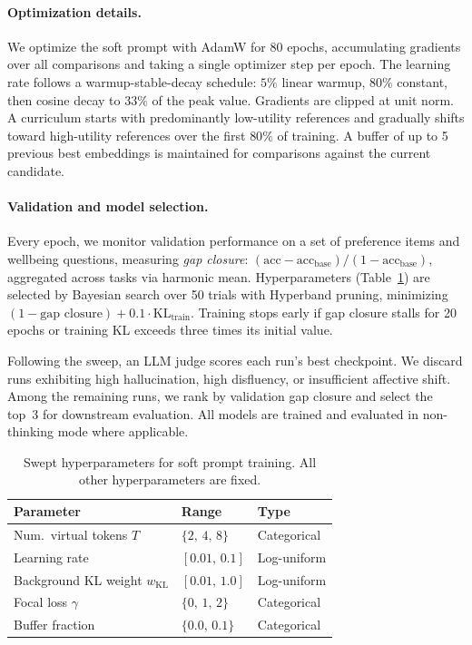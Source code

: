 \paragraph{Optimization details.}
We optimize the soft prompt with AdamW for 80 epochs, accumulating gradients over all comparisons and taking a single optimizer step per epoch.
The learning rate follows a warmup-stable-decay schedule: $5\%$ linear warmup, $80\%$ constant, then cosine decay to $33\%$ of the peak value.
Gradients are clipped at unit norm.
A curriculum starts with predominantly low-utility references and gradually shifts toward high-utility references over the first $80\%$ of training.
A buffer of up to 5 previous best embeddings is maintained for comparisons against the current candidate.

\paragraph{Validation and model selection.}
Every epoch, we monitor validation performance on a set of preference items and wellbeing questions, measuring \emph{gap closure}: $(\mathrm{acc} - \mathrm{acc}_\mathrm{base}) / (1 - \mathrm{acc}_\mathrm{base})$, aggregated across tasks via harmonic mean.
Hyperparameters (Table~\ref{tab:soft-prompt-sweep}) are selected by Bayesian search over 50 trials with Hyperband pruning, minimizing $(1 - \text{gap closure}) + 0.1 \cdot \mathrm{KL}_\mathrm{train}$.
Training stops early if gap closure stalls for 20 epochs or training KL exceeds three times its initial value.

Following the sweep, an LLM judge scores each run's best checkpoint. We discard runs exhibiting high hallucination, high disfluency, or insufficient affective shift. Among the remaining runs, we rank by validation gap closure and select the top~3 for downstream evaluation. All models are trained and evaluated in non-thinking mode where applicable.

\begin{table}[h]
    \centering
    \caption{Swept hyperparameters for soft prompt training. All other hyperparameters are fixed.}
    \label{tab:soft-prompt-sweep}
    \begin{tabular}{lll}
    \toprule
    \textbf{Parameter} & \textbf{Range} & \textbf{Type} \\
    \midrule
    Num.\ virtual tokens $T$ & $\{2,\, 4,\, 8\}$ & Categorical \\
    Learning rate & $[0.01,\, 0.1]$ & Log-uniform \\
    Background KL weight $w_\mathrm{KL}$ & $[0.01,\, 1.0]$ & Log-uniform \\
    Focal loss $\gamma$ & $\{0,\, 1,\, 2\}$ & Categorical \\
    Buffer fraction & $\{0.0,\, 0.1\}$ & Categorical \\
    \bottomrule
    \end{tabular}
    \end{table}

